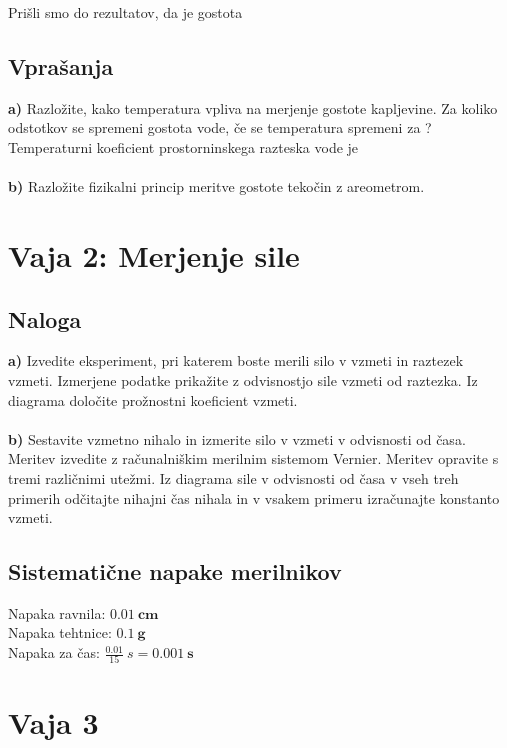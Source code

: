 \documentclass{report}
\begin{document}
Prišli smo do rezultatov, da je gostota 


\pagebreak
\section{Vprašanja}
\textbf{a)} Razložite, kako temperatura vpliva na merjenje gostote 
kapljevine. Za koliko odstotkov se spremeni gostota vode, če se 
temperatura spremeni za ? Temperaturni koeficient prostorninskega 
razteska vode je 
\\\\
\textbf{b)} Razložite fizikalni princip meritve gostote tekočin z areometrom.

\chapter{Vaja 2: Merjenje sile}

\section{Naloga}

\textbf{a)} Izvedite eksperiment, pri katerem boste merili silo v vzmeti in raztezek vzmeti. 
Izmerjene podatke prikažite z odvisnostjo sile vzmeti od raztezka. 
Iz diagrama določite prožnostni koeficient vzmeti.
\\\\
\textbf{b)} Sestavite vzmetno nihalo in izmerite silo v vzmeti v odvisnosti od časa. 
Meritev izvedite z računalniškim merilnim sistemom Vernier. 
Meritev opravite s tremi različnimi utežmi. 
Iz diagrama sile v odvisnosti od časa v vseh treh primerih odčitajte nihajni čas nihala in v vsakem primeru izračunajte konstanto vzmeti.

\section{Sistematične napake merilnikov}

Napaka ravnila: $\bm{0.01 \ cm}$ \\
Napaka tehtnice: $\bm{0.1 \ g}$ \\
Napaka za čas: $\frac{0.01}{15} \ s = \bm{0.001 \ s}$


\chapter{Vaja 3}
\end{document}
